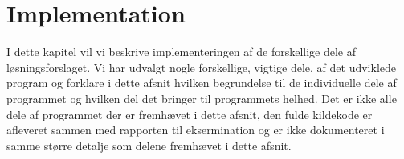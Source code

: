 \chapter{Implementation}\label{Implementation}
I dette kapitel vil vi beskrive implementeringen af de forskellige dele af løsningsforslaget. Vi har udvalgt nogle forskellige, vigtige dele, af det udviklede program og forklare i dette afsnit hvilken begrundelse til de individuelle dele af programmet og hvilken del det bringer til programmets helhed. Det er ikke alle dele af programmet der er fremhævet i dette afsnit, den fulde kildekode er afleveret sammen med rapporten til eksermination og er ikke dokumenteret i samme større detalje som delene fremhævet i dette afsnit.










